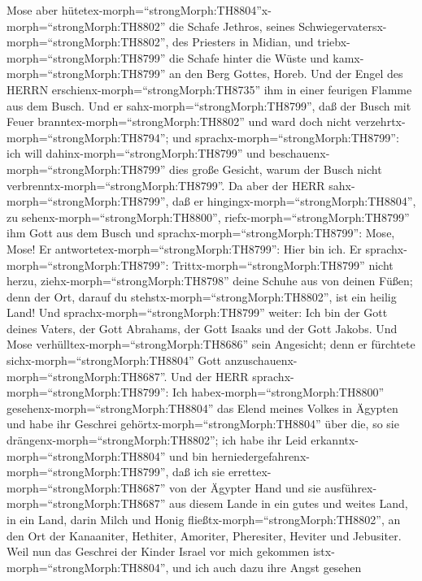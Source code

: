  Mose aber
hütetex-morph=``strongMorph:TH8804''x-morph=``strongMorph:TH8802'' die
Schafe Jethros, seines Schwiegervatersx-morph=``strongMorph:TH8802'',
des Priesters in Midian, und triebx-morph=``strongMorph:TH8799'' die
Schafe hinter die Wüste und kamx-morph=``strongMorph:TH8799'' an den
Berg Gottes, Horeb.  Und der Engel des HERRN
erschienx-morph=``strongMorph:TH8735'' ihm in einer feurigen Flamme aus
dem Busch. Und er sahx-morph=``strongMorph:TH8799'', daß der Busch mit
Feuer branntex-morph=``strongMorph:TH8802'' und ward doch nicht
verzehrtx-morph=``strongMorph:TH8794'';  und
sprachx-morph=``strongMorph:TH8799'': ich will
dahinx-morph=``strongMorph:TH8799'' und
beschauenx-morph=``strongMorph:TH8799'' dies große Gesicht, warum der
Busch nicht verbrenntx-morph=``strongMorph:TH8799''.  Da
aber der HERR sahx-morph=``strongMorph:TH8799'', daß er
hingingx-morph=``strongMorph:TH8804'', zu
sehenx-morph=``strongMorph:TH8800'', riefx-morph=``strongMorph:TH8799''
ihm Gott aus dem Busch und sprachx-morph=``strongMorph:TH8799'': Mose,
Mose! Er antwortetex-morph=``strongMorph:TH8799'': Hier bin ich.
 Er sprachx-morph=``strongMorph:TH8799'':
Trittx-morph=``strongMorph:TH8799'' nicht herzu,
ziehx-morph=``strongMorph:TH8798'' deine Schuhe aus von deinen Füßen;
denn der Ort, darauf du stehstx-morph=``strongMorph:TH8802'', ist ein
heilig Land!  Und sprachx-morph=``strongMorph:TH8799''
weiter: Ich bin der Gott deines Vaters, der Gott Abrahams, der Gott
Isaaks und der Gott Jakobs. Und Mose
verhülltex-morph=``strongMorph:TH8686'' sein Angesicht; denn er
fürchtete sichx-morph=``strongMorph:TH8804'' Gott
anzuschauenx-morph=``strongMorph:TH8687''.  Und der HERR
sprachx-morph=``strongMorph:TH8799'': Ich
habex-morph=``strongMorph:TH8800'' gesehenx-morph=``strongMorph:TH8804''
das Elend meines Volkes in Ägypten und habe ihr Geschrei
gehörtx-morph=``strongMorph:TH8804'' über die, so sie
drängenx-morph=``strongMorph:TH8802''; ich habe ihr Leid
erkanntx-morph=``strongMorph:TH8804''  und bin
herniedergefahrenx-morph=``strongMorph:TH8799'', daß ich sie
errettex-morph=``strongMorph:TH8687'' von der Ägypter Hand und sie
ausführex-morph=``strongMorph:TH8687'' aus diesem Lande in ein gutes und
weites Land, in ein Land, darin Milch und Honig
fließtx-morph=``strongMorph:TH8802'', an den Ort der Kanaaniter,
Hethiter, Amoriter, Pheresiter, Heviter und Jebusiter.  Weil
nun das Geschrei der Kinder Israel vor mich gekommen
istx-morph=``strongMorph:TH8804'', und ich auch dazu ihre Angst gesehen
